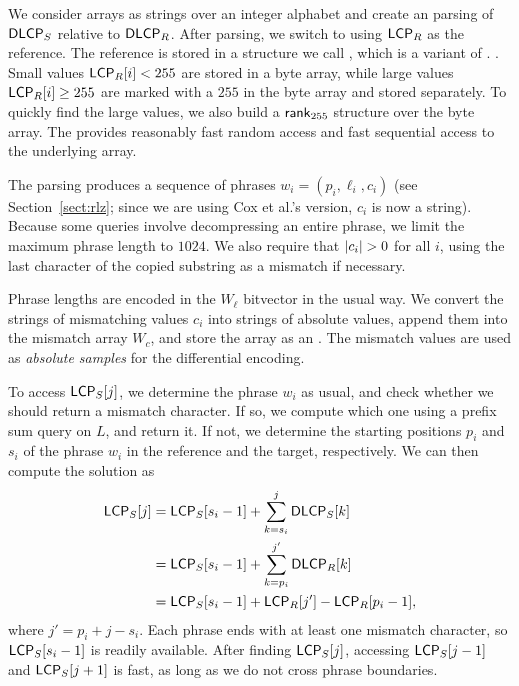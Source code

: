 We consider \DLCP{} arrays as strings over an integer alphabet and create an \RLZ{} parsing
of $\mathsf{DLCP}_{S}$ relative to $\mathsf{DLCP}_{R}$. After parsing, we switch to using
$\mathsf{LCP}_{R}$ as the reference. The reference is stored in a
structure we call \slarray, which is a variant of \LCPbyte.
\cite{Abouelhoda2004}. Small values $\mathsf{LCP}_{R}[i] < 255$ are stored in a byte
array, while large values $\mathsf{LCP}_{R}[i] \ge 255$ are marked with a $255$ in the
byte array and stored separately. To quickly find the large values, we also
build a $\mathsf{rank}_{255}$ structure over the byte array. The \slarray{} provides
reasonably fast random access and fast sequential access to the
underlying array.

The \RLZ{} parsing produces a sequence of phrases $w_{i} = (p_{i}, \ell_{i},
c_{i})$ (see Section~\ref{sect:rlz}; since we are using Cox et al.'s version, $c_{i}$ is now a string).
Because some queries involve decompressing an entire phrase, we limit the maximum phrase length to $1024$.
We also require that $\lvert c_{i} \rvert > 0$ for all $i$, using the last character of the copied substring
as a mismatch if necessary.

Phrase lengths are encoded in the $W_{\ell}$ bitvector in the usual way. We convert the strings of mismatching
\DLCP{} values $c_{i}$ into strings of absolute \LCP{} values, append them into the mismatch array $W_{c}$, and
store the array as an \slarray. The mismatch values are used as \emph{absolute
samples} for the differential encoding.

To access $\mathsf{LCP}_{S}[j]$, we determine the phrase $w_{i}$ as usual, and check whether we should return a mismatch character. If so, we compute which one using a prefix sum query on $L$, and return it.  If not, we determine the starting positions $p_{i}$ and $s_{i}$ of the phrase $w_{i}$ in the reference and the target, respectively. We can then compute the solution as
\begin{align*}
\mathsf{LCP}_{S}[j] &= \mathsf{LCP}_{S}[s_{i} - 1] + \sum_{k = s_{i}}^{j} \mathsf{DLCP}_{S}[k] \\
&= \mathsf{LCP}_{S}[s_{i} - 1] + \sum_{k = p_{i}}^{j'} \mathsf{DLCP}_{R}[k] \\
&= \mathsf{LCP}_{S}[s_{i} - 1] + \mathsf{LCP}_{R}[j'] - \mathsf{LCP}_{R}[p_{i} - 1],
\end{align*}
where $j' = p_{i} + j - s_{i}$.
Each \RLZ{} phrase ends with at least one mismatch character, so $\mathsf{LCP}_{S}[s_{i} - 1]$ is readily available. After finding $\mathsf{LCP}_{S}[j]$, accessing $\mathsf{LCP}_{S}[j-1]$ and $\mathsf{LCP}_{S}[j+1]$ is fast, as long as we do not cross phrase boundaries.


